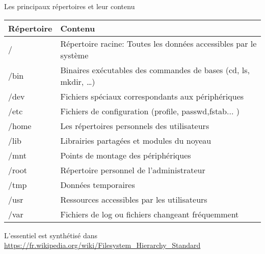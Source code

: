 \begin{frame}{Les principaux répertoires et leur contenu}
  \begin{center}
    \begin{tabular}{ll}
      \hline
      Répertoire&Contenu\\[3pt]
      \hline
      /		&Répertoire racine: Toutes les données accessibles par le système\\[3pt]
      /bin		&Binaires exécutables des commandes de bases (cd, ls, mkdir, \dots)\\[3pt]
      /dev		&Fichiers spéciaux correspondants aux périphériques\\[3pt]
      /etc		&Fichiers de configuration (profile, passwd,fstab... )\\[3pt]
      /home	&Les répertoires personnels des utilisateurs\\[3pt]
      /lib		&Librairies partagées et modules du noyeau\\[3pt]
      /mnt		&Points de montage des périphériques\\[3pt]
      /root		&Répertoire personnel de l'administrateur\\[3pt]
      /tmp		&Données temporaires\\[3pt]
      /usr		&Ressources accessibles par les utilisateurs\\[3pt]
      /var		&Fichiers de log ou fichiers changeant fréquemment\\[3pt]
      \hline
    \end{tabular}
  \end{center}
  L'essentiel est synthétisé dans
  \url{https://fr.wikipedia.org/wiki/Filesystem_Hierarchy_Standard}
\end{frame}
